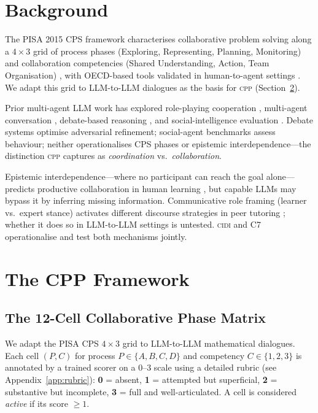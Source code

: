 \documentclass{article}
\newcommand{\CPP}{\textsc{cpp}}
\newcommand{\CIDI}{\textsc{cidi}}
\begin{document}
\section{Background}
\label{sec:background}

The PISA 2015 CPS framework characterises collaborative problem solving
along a $4 \times 3$ grid of process phases (Exploring, Representing,
Planning, Monitoring) and collaboration competencies (Shared Understanding,
Action, Team Organisation) \citep{pisa2015cps,graesser2017complex,graesser2018advancing},
with OECD-based tools validated in human-to-agent settings
\citep{rojas2021assessing}. We adapt this grid to LLM-to-LLM dialogues
as the basis for \CPP{} (Section~\ref{sec:framework}).

Prior multi-agent LLM work has explored role-playing cooperation
\citep{li2023camel, hong2023metagpt, qian2023chatdev}, multi-agent
conversation \citep{wu2024autogen}, debate-based reasoning
\citep{liang2023encouraging, du2023improving}, and social-intelligence
evaluation \citep{park2023generative, zhou2023sotopia}. Debate systems
optimise adversarial refinement; social-agent benchmarks assess behaviour;
neither operationalises CPS phases or epistemic interdependence---the
distinction \CPP{} captures as \emph{coordination} vs.\ \emph{collaboration}.

Epistemic interdependence---where no participant can reach the goal
alone---predicts productive collaboration in human learning
\citep{barron2003conditions,johnson2009cooperative}, but capable LLMs may
bypass it by inferring missing information. Communicative role framing
(learner vs.\ expert stance) activates different discourse strategies in
peer tutoring \citep{chi2001learning,king1992facilitating}; whether it
does so in LLM-to-LLM settings is untested. \CIDI{} and C7 operationalise
and test both mechanisms jointly.

\section{The CPP Framework}
\label{sec:framework}

\subsection{The 12-Cell Collaborative Phase Matrix}

We adapt the PISA CPS $4 \times 3$ grid to LLM-to-LLM mathematical
dialogues. Each cell $(P, C)$ for process $P \in \{A, B, C, D\}$ and
competency $C \in \{1, 2, 3\}$ is annotated by a trained scorer on a
0--3 scale using a detailed rubric (see Appendix~\ref{app:rubric}):
\textbf{0} = absent, \textbf{1} = attempted but superficial,
\textbf{2} = substantive but incomplete, \textbf{3} = full and
well-articulated. A cell is considered \emph{active} if its score
$\geq 1$.
\end{document}
